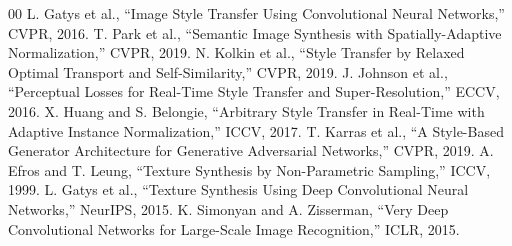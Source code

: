 \documentclass[conference]{IEEEtran}
\begin{document}
\begin{thebibliography}{00}
 L. Gatys et al., ``Image Style Transfer Using Convolutional Neural Networks,'' CVPR, 2016.
 T. Park et al., ``Semantic Image Synthesis with Spatially-Adaptive Normalization,'' CVPR, 2019.
 N. Kolkin et al., ``Style Transfer by Relaxed Optimal Transport and Self-Similarity,'' CVPR, 2019.
 J. Johnson et al., ``Perceptual Losses for Real-Time Style Transfer and Super-Resolution,'' ECCV, 2016.
 X. Huang and S. Belongie, ``Arbitrary Style Transfer in Real-Time with Adaptive Instance Normalization,'' ICCV, 2017.
 T. Karras et al., ``A Style-Based Generator Architecture for Generative Adversarial Networks,'' CVPR, 2019.
 A. Efros and T. Leung, ``Texture Synthesis by Non-Parametric Sampling,'' ICCV, 1999.
 L. Gatys et al., ``Texture Synthesis Using Deep Convolutional Neural Networks,'' NeurIPS, 2015.
 K. Simonyan and A. Zisserman, ``Very Deep Convolutional Networks for Large-Scale Image Recognition,'' ICLR, 2015.
\end{thebibliography}
\end{document}
